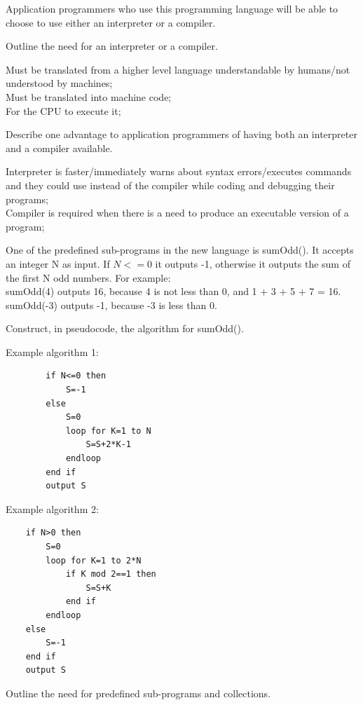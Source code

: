 \begin{exercise*}
Application programmers who use this programming language will be able to choose to use either an interpreter or a compiler.
\begin{parts}
\item Outline the need for an interpreter or a compiler.
	\begin{solution}
	Must be translated from a higher level language understandable by humans/not understood by machines;\\
	Must be translated into machine code;\\
	For the CPU to execute it;\\
	\end{solution}
\item Describe one advantage to application programmers of having both an interpreter and a compiler available.
	\begin{solution}
		Interpreter is faster/immediately warns about syntax errors/executes commands and they could use instead of the compiler while coding and debugging their programs;\\
		Compiler is required when there is a need to produce an executable version of a program;
	\end{solution}
\end{parts}
One of the predefined sub-programs in the new language is sumOdd(). It accepts an integer N as input. If $N <= 0$ it outputs -1, otherwise it outputs the sum of the first N odd numbers.
For example:\\
sumOdd(4) outputs 16, because 4 is not less than 0, and 1 + 3 + 5 + 7 = 16.
sumOdd(-3) outputs -1, because -3 is less than 0.
\begin{parts}
\item Construct, in pseudocode, the algorithm for sumOdd().
	\begin{solution}
		Example algorithm 1:
		\begin{verbatim}
		if N<=0 then
			S=-1
		else
			S=0
			loop for K=1 to N
				S=S+2*K-1
			endloop
		end if
		output S
		\end{verbatim}
Example algorithm 2:
	\begin{verbatim}
	if N>0 then	
		S=0	
		loop for K=1 to 2*N	
			if K mod 2==1 then	
				S=S+K	
			end if	
		endloop	
	else	
		S=-1	
	end if	
	output S
	\end{verbatim}

	\end{solution}
\item Outline the need for predefined sub-programs and collections.
\end{parts}
\end{exercise*}




